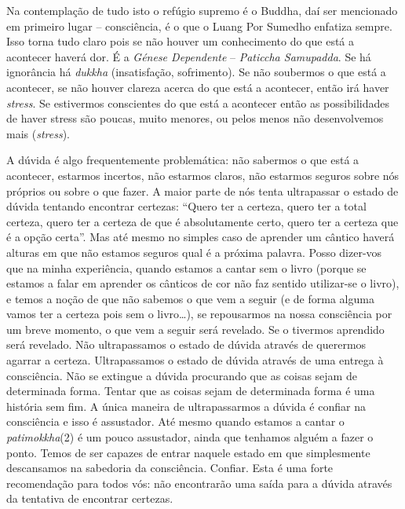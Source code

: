 Na contemplação de tudo isto o refúgio supremo é o Buddha, daí ser
mencionado em primeiro lugar -- consciência, é o que o Luang Por Sumedho
enfatiza sempre. Isso torna tudo claro pois se não houver um
conhecimento do que está a acontecer haverá dor. É a \emph{Génese
Dependente} -- \emph{Paticcha Samupadda}. Se há ignorância há
\emph{dukkha} (insatisfação, sofrimento). Se não soubermos o que está a
acontecer, se não houver clareza acerca do que está a acontecer, então
irá haver \emph{stress}. Se estivermos conscientes do que está a
acontecer então as possibilidades de haver stress são poucas, muito
menores, ou pelos menos não desenvolvemos mais (\emph{stress}).

A dúvida é algo frequentemente problemática: não sabermos o que está a
acontecer, estarmos incertos, não estarmos claros, não estarmos seguros
sobre nós próprios ou sobre o que fazer. A maior parte de nós tenta
ultrapassar o estado de dúvida tentando encontrar certezas: ``Quero ter
a certeza, quero ter a total certeza, quero ter a certeza de que é
absolutamente certo, quero ter a certeza que é a opção certa''. Mas até
mesmo no simples caso de aprender um cântico haverá alturas em que não
estamos seguros qual é a próxima palavra. Posso dizer-vos que na minha
experiência, quando estamos a cantar sem o livro (porque se estamos a
falar em aprender os cânticos de cor não faz sentido utilizar-se o
livro), e temos a noção de que não sabemos o que vem a seguir (e de
forma alguma vamos ter a certeza pois sem o livro\ldots{}), se
repousarmos na nossa consciência por um breve momento, o que vem a
seguir será revelado. Se o tivermos aprendido será revelado. Não
ultrapassamos o estado de dúvida através de querermos agarrar a certeza.
Ultrapassamos o estado de dúvida através de uma entrega à consciência.
Não se extingue a dúvida procurando que as coisas sejam de determinada
forma. Tentar que as coisas sejam de determinada forma é uma história
sem fim. A única maneira de ultrapassarmos a dúvida é confiar na
consciência e isso é assustador. Até mesmo quando estamos a cantar o
\emph{patimokkha}(2) é um pouco assustador, ainda que tenhamos alguém a
fazer o ponto. Temos de ser capazes de entrar naquele estado em que
simplesmente descansamos na sabedoria da consciência. Confiar. Esta é
uma forte recomendação para todos vós: não encontrarão uma saída para a
dúvida através da tentativa de encontrar certezas.

